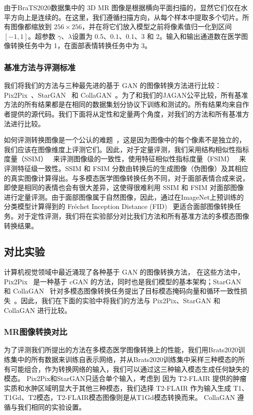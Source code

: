 由于BraTS2020数据集中的 3D MR 图像是根据横向平面扫描的，显然它们仅在水平方向上是连续的。在这里，我们遵循扫描方向，从每个样本中提取多个切片。所有图像都缩放到 $256\times256$，并在将它们放入模型之前将像素值归一化到区间 $[-1, 1]$。超参数 $\gamma$、$\lambda$设置为 $0.5$、$0.1$、$0.1$、$3$ 和 $2$。输入和输出通道数在医学图像转换任务中为 1，在面部表情转换任务中为 3。

\subsubsection{基准方法与评测标准}

我们将我们的方法与三种最先进的基于 GAN 的图像转换方法进行比较：Pix2Pix~\cite{pix2pix}、StarGAN~\cite{stargan} 和 CollaGAN~\cite{collagan}。为了和我们的JAGAN公平比较，所有基准方法的所有结果都是在相同的数据集划分协议下训练和测试的。所有结果均来自作者提供的源代码。我们下面将从定性和定量两个角度，对我们的方法和所有基准方法进行比较。

如何评测转换图像是一个公认的难题~\cite{salimans2016improved}，这是因为图像中的每个像素不是独立的，我们应该在图像维度上评测它们。因此，对于定量评测，我们采用结构相似性指标度量（SSIM）~\cite{ssim} 来评测图像级的一致性，使用特征相似性指标度量（FSIM）~\cite{fsim} 来评测特征级一致性。SSIM 和 FSIM 分数由转换后的生成图像（伪图像）及其相应的真实图像计算得出。与多模态医学图像转换任务不同，对于面部表情合成来说，即使是相同的表情也会有很大差异，这使得很难利用 SSIM 和 FSIM 对面部图像进行定量评测。由于面部图像属于自然图像，因此，通过在ImageNet上预训练的分类模型计算得到的 Fréchet Inception Distance (FID)~\cite{fid} 更适合面部图像转换任务。对于定性评测，我们将在实验部分对比我们方法和所有基准方法的多模态图像转换结果。

\subsection{对比实验}

计算机视觉领域中最近涌现了各种基于 GAN 的图像转换方法， 在这些方法中，Pix2Pix~\cite{pix2pix} 是一种基于 cGAN 的方法，同时也是我们模型的基本架构；StarGAN~\cite{stargan} 和 CollaGAN~\cite{collagan} 针对多模态图像转换任务提出了目标模态掩码向量和循环一致性损失~\cite{cyclegan}。因此，我们在下面的实验中将我们的方法与 Pix2Pix、StarGAN 和 CollaGAN 进行比较。

\subsubsection{MR图像转换对比}
为了评测我们所提出的方法在多模态医学图像转换上的性能，我们用Brats2020训练集中的所有数据来训练自表示网络，并从Brats2020训练集中采样三种模态的所有可能组合，作为转换网络的输入，我们可以通过这三种输入模态生成任何缺失的模态。 Pix2Pix和StarGAN只适合单个输入，考虑到 因为 T2-FLAIR 提供的肿瘤实质和水肿区域明显大于其他三种模态，我们选择 T2-FLAIR 作为输入生成 T1、T1Gd、T2模态，T2-FLAIR模态图像则是从T1Gd模态转换而来。 CollaGAN 遵循与我们相同的实验设置。

